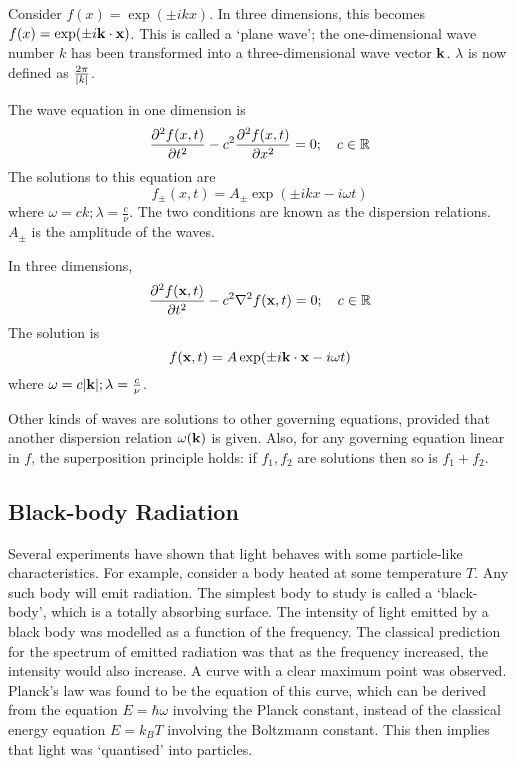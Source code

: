 Consider \( f(x) = \exp(\pm i k x) \).
In three dimensions, this becomes \( f(x) = \exp(\pm i \vb k \cdot \vb x) \).
This is called a `plane wave'; the one-dimensional wave number \( k \) has been transformed into a three-dimensional wave vector \( \vb k \).
\( \lambda \) is now defined as \( \frac{2\pi}{\abs{k}} \).

The wave equation in one dimension is
\[
	\pdv[2]{f(x,t)}{t} - c^2 \pdv[2]{f(x,t)}{x} = 0;\quad c \in \mathbb R
\]
The solutions to this equation are
\[
	f_\pm (x,t) = A_\pm \exp(\pm i k x - i \omega t)
\]
where \( \omega = c k; \lambda = \frac{c}{\nu} \).
The two conditions are known as the dispersion relations.
\( A_\pm \) is the amplitude of the waves.

In three dimensions,
\[
	\pdv[2]{f(\vb x,t)}{t} - c^2 \laplacian f(\vb x,t) = 0;\quad c \in \mathbb R
\]
The solution is
\[
	f (\vb x,t) = A \exp(\pm i \vb k \cdot \vb x - i \omega t)
\]
where \( \omega = c \abs{\vb k}; \lambda = \frac{c}{\nu} \).

\begin{note}
	Other kinds of waves are solutions to other governing equations, provided that another dispersion relation \( \omega(\vb k) \) is given.
	Also, for any governing equation linear in \( f \), the superposition principle holds: if \( f_1, f_2 \) are solutions then so is \( f_1 + f_2 \).
\end{note}

\subsection{Black-body Radiation}
Several experiments have shown that light behaves with some particle-like characteristics.
For example, consider a body heated at some temperature \( T \).
Any such body will emit radiation.
The simplest body to study is called a `black-body', which is a totally absorbing surface.
The intensity of light emitted by a black body was modelled as a function of the frequency.
The classical prediction for the spectrum of emitted radiation was that as the frequency increased, the intensity would also increase.
A curve with a clear maximum point was observed.
Planck's law was found to be the equation of this curve, which can be derived from the equation \( E = \hbar \omega \) involving the Planck constant, instead of the classical energy equation \( E = k_B T \) involving the Boltzmann constant.
This then implies that light was `quantised' into particles.
